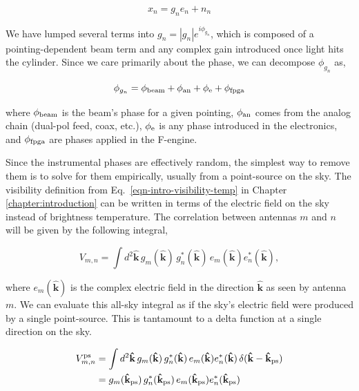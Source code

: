 \begin{equation}
     x_n = g_n e_n + n_n
\end{equation}

\noindent We have lumped several terms into $g_n = |g_n| e^{i \phi_{g_n}}$, 
which is composed of a pointing-dependent beam term
and any complex gain introduced once light hits the cylinder. 
Since we care primarily about the phase, we can decompose $\phi_{g_n}$
as,

\begin{equation}
\phi_{g_n} = \phi_{\rm beam} + \phi_{\rm an} + \phi_{\rm e} + \phi_{\rm fpga} 
\end{equation}

\noindent where $\phi_{\rm beam}$ is the beam's phase for a given pointing, 
$\phi_{\rm an}$ comes from the analog chain (dual-pol feed, coax, etc.),  
$\phi_{\rm e}$ is any phase introduced in the electronics, 
and $\phi_{\rm fpga}$ are phases applied in the F-engine. 

Since the instrumental phases are effectively random, the simplest 
way to remove them is to solve for them empirically, usually from 
a point-source on the sky. The visibility definition from 
Eq.~\ref{eqn-intro-visibility-temp} in Chapter \ref{chapter:introduction} 
can be written in terms 
of the electric field on the sky 
instead of brightness temperature.
The correlation between antennas $m$ and $n$ will be given 
by the following integral,

\begin{equation}
\label{eqn-visibility}
     V_{m,n} = \int d^2\mathbf{\hat{k}} \,
     g_m(\mathbf{\hat{k}}) \, g^*_n(\mathbf{\hat{k}})\, e_m(\mathbf{\hat{k}}) e_n^*(\mathbf{\hat{k}}),
\end{equation}

\noindent where $e_m(\mathbf{\hat{k}})$ is the complex electric 
field in the direction $\mathbf{\hat{k}}$ as seen by 
antenna $m$. We can evaluate this all-sky integral 
as if the sky's electric field were produced by a single point-source. 
This is tantamount to a delta function at a single direction on the sky.

\begin{align}
\label{eqn-vis_delta}
V^{\rm ps}_{m,n} &= \int d^2\mathbf{\hat{k}} \, g_m(\mathbf{\hat{k}}) \, g^*_n(\mathbf{\hat{k}})\, e_m(\mathbf{\hat{k}}) e_n^*(\mathbf{\hat{k}})\, \delta(\mathbf{\hat{k}} - \mathbf{\hat{k}}_{\rm ps})\\
 &= {g}_m(\mathbf{\hat{k}}_{\rm ps}) \, g^*_n(\mathbf{\hat{k}}_{\rm ps})\,e_m(\mathbf{\hat{k}}_{\rm ps}) e_n^*(\mathbf{\hat{k}}_{\rm ps})
\end{align}

